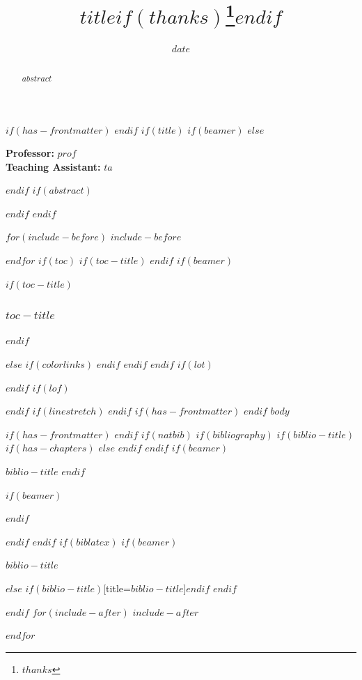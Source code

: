 \documentclass[
$if(fontsize)$
  $fontsize$,
$endif$
$if(lang)$
  $babel-lang$,
$endif$
$if(papersize)$
  $papersize$paper,
$endif$
$if(beamer)$
  ignorenonframetext,
$if(handout)$
  handout,
$endif$
$if(aspectratio)$
  aspectratio=$aspectratio$,
$endif$
$endif$
$for(classoption)$
  $classoption$$sep$,
$endfor$
]{$documentclass$}
\title{\textsc{\Large{$title$$if(thanks)$\thanks{$thanks$}$endif$}}\vspace{-2ex}}
\author{\textsc{\Large{$for(author)$$author$$sep$ \and $endfor$}}}
\date{$date$}
\institute{$for(institute)$$institute$$sep$ \and $endfor$}
\newif\ifbibliography
\begin{document}
$if(has-frontmatter)$
\frontmatter
$endif$
$if(title)$
$if(beamer)$
\frame{\titlepage}
$else$
\maketitle
\vspace{-0.75cm}
\begin{center}
\normalsize{\textbf{Professor:} \textit{$prof$}} \\
\normalsize{\textbf{Teaching Assistant:} \textit{$ta$}} \\
\vspace{0.25cm}
\end{center}

$endif$
$if(abstract)$
\begin{abstract}
$abstract$
\end{abstract}
$endif$
$endif$

$for(include-before)$
$include-before$

$endfor$
$if(toc)$
$if(toc-title)$
\renewcommand*\contentsname{$toc-title$}
$endif$
$if(beamer)$
\begin{frame}[allowframebreaks]
$if(toc-title)$
  \frametitle{$toc-title$}
$endif$
  \tableofcontents[hideallsubsections]
\end{frame}
$else$
{
$if(colorlinks)$
\hypersetup{linkcolor=$if(toccolor)$$toccolor$$else$$endif$}
$endif$
\setcounter{tocdepth}{$toc-depth$}
\tableofcontents
}
$endif$
$endif$
$if(lot)$
\listoftables
$endif$
$if(lof)$
\listoffigures
$endif$
$if(linestretch)$
$endif$
$if(has-frontmatter)$
\mainmatter
$endif$
$body$

$if(has-frontmatter)$
\backmatter
$endif$
$if(natbib)$
$if(bibliography)$
$if(biblio-title)$
$if(has-chapters)$
\renewcommand\bibname{$biblio-title$}
$else$
\renewcommand\refname{$biblio-title$}
$endif$
$endif$
$if(beamer)$
\begin{frame}[allowframebreaks]{$biblio-title$}
  \bibliographytrue
$endif$
  
$if(beamer)$
\end{frame}
$endif$

$endif$
$endif$
$if(biblatex)$
$if(beamer)$
\begin{frame}[allowframebreaks]{$biblio-title$}
  \bibliographytrue
  \printbibliography[heading=none]
\end{frame}
$else$
\printbibliography$if(biblio-title)$[title=$biblio-title$]$endif$
$endif$

$endif$
$for(include-after)$
$include-after$

$endfor$
\end{document}
